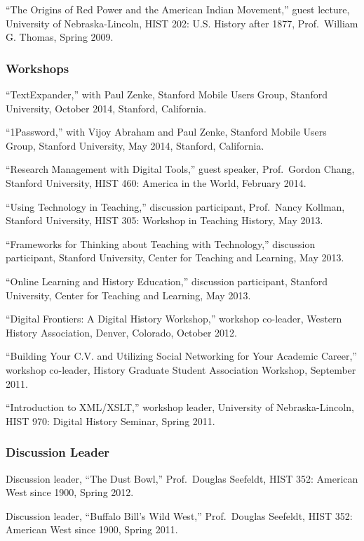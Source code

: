 ``The Origins of Red Power and the American Indian Movement,'' guest
lecture, University of Nebraska-Lincoln, HIST 202: U.S. History after
1877, Prof.~William G. Thomas, Spring 2009.

\subsubsection{Workshops}\label{workshops}

``TextExpander,'' with Paul Zenke, Stanford Mobile Users Group, Stanford
University, October 2014, Stanford, California.

``1Password,'' with Vijoy Abraham and Paul Zenke, Stanford Mobile Users
Group, Stanford University, May 2014, Stanford, California.

``Research Management with Digital Tools,'' guest speaker, Prof.~Gordon
Chang, Stanford University, HIST 460: America in the World, February
2014.

``Using Technology in Teaching,'' discussion participant, Prof.~Nancy
Kollman, Stanford University, HIST 305: Workshop in Teaching History,
May 2013.

``Frameworks for Thinking about Teaching with Technology,'' discussion
participant, Stanford University, Center for Teaching and Learning, May
2013.

``Online Learning and History Education,'' discussion participant,
Stanford University, Center for Teaching and Learning, May 2013.

``Digital Frontiers: A Digital History Workshop,'' workshop co-leader,
Western History Association, Denver, Colorado, October 2012.

``Building Your C.V. and Utilizing Social Networking for Your Academic
Career,'' workshop co-leader, History Graduate Student Association
Workshop, September 2011.

``Introduction to XML/XSLT,'' workshop leader, University of
Nebraska-Lincoln, HIST 970: Digital History Seminar, Spring 2011.

\subsubsection{Discussion Leader}\label{discussion-leader}

Discussion leader, ``The Dust Bowl,'' Prof.~Douglas Seefeldt, HIST 352:
American West since 1900, Spring 2012.

Discussion leader, ``Buffalo Bill's Wild West,'' Prof.~Douglas Seefeldt,
HIST 352: American West since 1900, Spring 2011.

